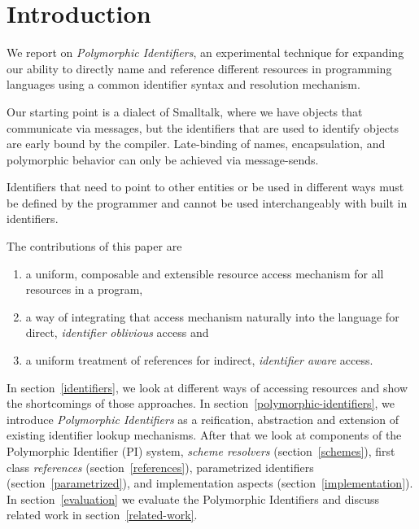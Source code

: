 \documentclass[preprint,authoryear]{llncs}
\newcommand\rh[1]{\mynote{Robert}{#1}}
\begin{document}

\section{Introduction}

\rh{experimental?}

We report on \emph{Polymorphic Identifiers}, an experimental
technique for expanding our ability to directly name and reference different 
resources
in programming languages using a common identifier syntax and resolution
mechanism.



Our starting point is a dialect of Smalltalk, where we have objects
that communicate via messages\cite{Goldberg1983}, but the identifiers that are used to identify 
objects are early bound by the compiler.  Late-binding of names, encapsulation,
and polymorphic behavior can only be achieved via message-sends.


Identifiers that need to point to other entities or be used in different ways must be defined
by the programmer and cannot be used interchangeably with built in identifiers.  

The contributions of this paper are
\begin{enumerate} 

\item a uniform, composable and extensible resource access mechanism for all
resources in a program, 
\item  a way of integrating that access mechanism naturally into the language for
direct, \emph{identifier oblivious} access and
\item a uniform treatment of references for indirect, \emph{identifier aware} access.
\end{enumerate}



In section~\ref{identifiers}, we  look at different ways of accessing resources and show
the shortcomings of those approaches.  In section~\ref{polymorphic-identifiers}, we 
introduce \emph{Polymorphic Identifiers} as a reification, abstraction and extension of existing 
identifier lookup mechanisms.  After that we look at components of the Polymorphic Identifier (PI)
system, \emph{scheme resolvers} (section~\ref{schemes}), first class \emph{references} (section~\ref{references}),
parametrized identifiers (section~\ref{parametrized}), and  implementation aspects (section~\ref{implementation}).
In section~\ref{evaluation} we evaluate the Polymorphic Identifiers and discuss related work in section~\ref{related-work}.
\end{document}
